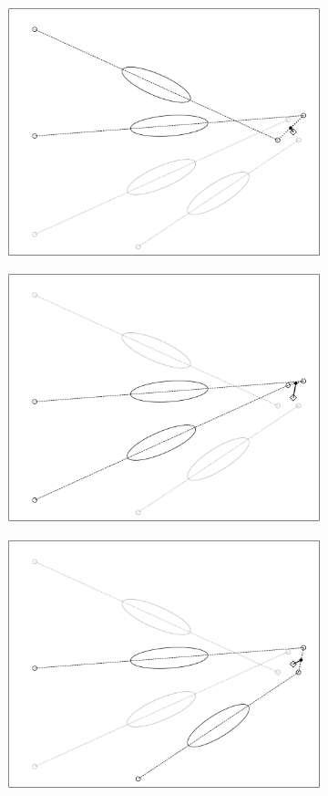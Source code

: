 \begin{figure}
    \begin{subfigure}{0.3\textwidth}
        \includegraphics[width=0.9\linewidth]{Plots/stereo_magic_1.pdf} 
    \end{subfigure}
    \begin{subfigure}{0.3\textwidth}
        \includegraphics[width=0.9\linewidth]{Plots/stereo_magic_2.pdf}
    \end{subfigure}
    \begin{subfigure}{0.3\textwidth}
        \includegraphics[width=0.9\linewidth]{Plots/stereo_magic_3.pdf} 

\end{subfigure}
\end{figure}
